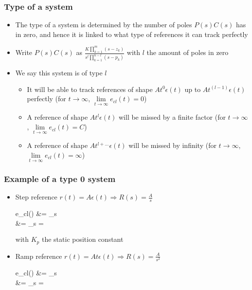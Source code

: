 \begin{frame}
	\frametitle{Type of a system}
	\begin{itemize}
		\item The type of a system is determined by the number of poles $P(s)C(s)$ has in zero, and hence it is linked to what type of references it can track perfectly
		\item Write $P(s)C(s)$ as $\frac{K \prod_{k=1}^{m} (s-z_k)}{s^l \prod_{k=1}^{n-l} (s-p_k)}$ with $l$ the amount of poles in zero
		\item We say this system is of type $l$
		\begin{itemize}
			\item It will be able to track references of shape $At^0 \epsilon(t)$ up to $At^{(l - 1)} \epsilon(t)$ perfectly (for $t\rightarrow \infty$, $\lim\limits_{t \rightarrow \infty} e_{cl}(t) = 0$)
			\item A reference of shape $At^l \epsilon(t)$ will be missed by a finite factor (for $t\rightarrow \infty$, $\lim\limits_{t \rightarrow \infty} e_{cl}(t) = C$)
			\item A reference of shape $At^{l+...} \epsilon(t)$ will be missed by infinity (for $t\rightarrow \infty$, $\lim\limits_{t \rightarrow \infty} e_{cl}(t) = \infty$)
		\end{itemize}
	\end{itemize}
\end{frame}

\begin{frame}
	\frametitle{Example of a type 0 system}
	\begin{itemize}
		\item Step reference $r(t) = A \epsilon (t) \Rightarrow R(s) = \frac{A}{s}$
		\begin{flalign*}
			e_{cl}(\infty) &= \lim\limits_{s }   \\
			&= \lim\limits_{s } 
			= 
		\end{flalign*}
		with $K_p$ the static position constant
		\item Ramp reference $r(t) = At \epsilon (t) \Rightarrow R(s) = \frac{A}{s^2}$
		\begin{flalign*}
			e_{cl}(\infty) &= \lim\limits_{s }  \frac{A}{s^2} \\
			&= \lim\limits_{s }  = \infty
		\end{flalign*}
	\end{itemize}
\end{frame}	


